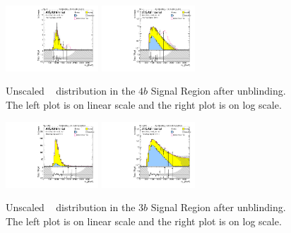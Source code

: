 \begin{figure}[htbp!]
\begin{center}
\includegraphics[width=0.31\textwidth,angle=-90]{figures/boosted/Signal_Syst/Moriond_bkg_9_FourTag_Signal_mHH_l.pdf}
\includegraphics[width=0.31\textwidth,angle=-90]{figures/boosted/Signal_Syst/Moriond_bkg_9_FourTag_Signal_mHH_l_1.pdf}
  \caption{Unscaled \mtwoJ~ distribution in the $4b$ Signal Region after unblinding. The left plot is on linear scale and the right plot is on log scale.}
  \label{fig:boosted-4b-signal-l}
\end{center}
\end{figure}

\begin{figure}[htbp!]
\begin{center}
\includegraphics[width=0.31\textwidth,angle=-90]{figures/boosted/Signal_Syst/Moriond_bkg_9_ThreeTag_Signal_mHH_l.pdf}
\includegraphics[width=0.31\textwidth,angle=-90]{figures/boosted/Signal_Syst/Moriond_bkg_9_ThreeTag_Signal_mHH_l_1.pdf}  
  \caption{Unscaled \mtwoJ~ distribution in the $3b$ Signal Region after unblinding. The left plot is on linear scale and the right plot is on log scale.}
  \label{fig:boosted-3b-signal-l}
\end{center}
\end{figure}

